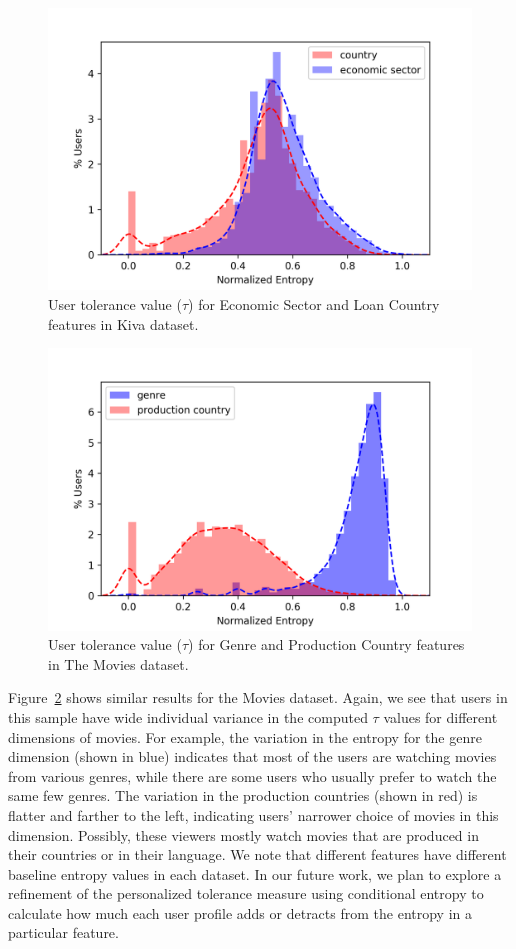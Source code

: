 \begin{figure}[tbh]
    \centering
    \includegraphics[width=0.8\linewidth]{imgs/ofair/kiva_user_entropy_distribitions_lineDist.png}
    \caption{User tolerance value ($\tau$) for Economic Sector and Loan Country features in Kiva dataset.}
    \label{fig:tau_vector_Kiva}
\end{figure}


\begin{figure}[tbh]
    \centering
    \includegraphics[width=0.8\linewidth]{imgs/ofair/ml_user_entropy_distribitions_lineDist.png}
    \caption{User tolerance value ($\tau$) for Genre and Production Country features in The Movies dataset.}
    \label{fig:tau_vector_ML}
\end{figure}

Figure~\ref{fig:tau_vector_ML} shows similar results for the Movies dataset. Again, we see that users in this sample have wide individual variance in the computed $\tau$ values for different dimensions of movies. For example, the variation in the entropy for the genre dimension (shown in blue) indicates that most of the users are watching movies from various genres, while there are some users who usually prefer to watch the same few genres. The variation in the production countries (shown in red) is flatter and farther to the left, indicating users' narrower choice of movies in this dimension. Possibly, these viewers mostly watch movies that are produced in their countries or in their language. We note that different features have different baseline entropy values in each dataset. In our future work, we plan to explore a refinement of the personalized tolerance measure using conditional entropy to calculate how much each user profile adds or detracts from the entropy in a particular feature.


